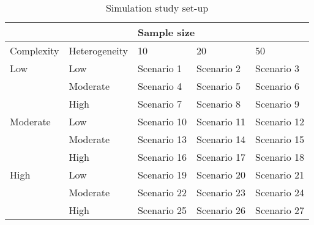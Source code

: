 \documentclass[a4paper, man, floatsintext]{apa6}
\begin{document}
\linebreak
\begin{table}[!h]
\caption{Simulation study set-up}
\begin{tabular}{@{}ll|lll@{}}
\toprule
           &               & \multicolumn{3}{l}{Sample size}         \\ \midrule
Complexity & Heterogeneity & 10          & 20          & 50          \\ \midrule
Low        & Low           & Scenario 1  & Scenario 2  & Scenario 3  \\
           & Moderate      & Scenario 4  & Scenario 5  & Scenario 6  \\
           & High          & Scenario 7  & Scenario 8  & Scenario 9  \\
Moderate   & Low           & Scenario 10 & Scenario 11 & Scenario 12 \\
           & Moderate      & Scenario 13 & Scenario 14 & Scenario 15 \\
           & High          & Scenario 16 & Scenario 17 & Scenario 18 \\
High       & Low           & Scenario 19 & Scenario 20 & Scenario 21 \\
           & Moderate      & Scenario 22 & Scenario 23 & Scenario 24 \\
           & High          & Scenario 25 & Scenario 26 & Scenario 27 \\ \bottomrule
\end{tabular}
\end{table}



\end{document}

